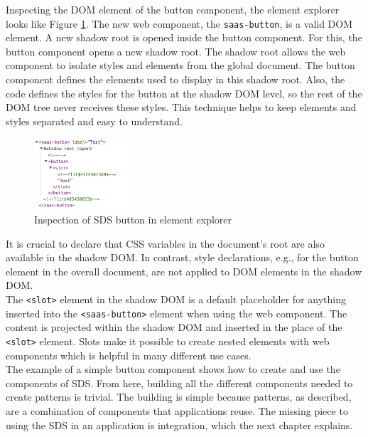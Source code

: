Inspecting the \ac{DOM} element of the button component, the element explorer looks like Figure \ref{button_element_explorer}. The new web component, the \texttt{saas-button}, is a valid \ac{DOM} element. A new shadow root is opened inside the button component. For this, the button component opens a new shadow root. The shadow root allows the web component to isolate styles and elements from the global document. The button component defines the elements used to display in this shadow root. Also, the code defines the styles for the button at the shadow \ac{DOM} level, so the rest of the \ac{DOM} tree never receives these styles. This technique helps to keep elements and styles separated and easy to understand. \\
\begin{figure}[htbp]
    \centerline{\includegraphics[height=100px]{images/button_element_explorer.png}}
    \caption{Inspection of \ac{SDS} button in element explorer}
    \label{button_element_explorer}
\end{figure}
It is crucial to declare that \ac{CSS} variables in the document's root are also available in the shadow \ac{DOM}. In contrast, style declarations, e.g., for the button element in the overall document, are not applied to \ac{DOM} elements in the shadow \ac{DOM}. \\
The \texttt{<slot>} element in the shadow \ac{DOM} is a default placeholder for anything inserted into the \texttt{<saas-button>} element when using the web component. The content is projected within the shadow \ac{DOM} and inserted in the place of the \texttt{<slot>} element. Slots make it possible to create nested elements with web components which is helpful in many different use cases.  \\

The example of a simple button component shows how to create and use the components of \ac{SDS}. From here, building all the different components needed to create patterns is trivial. The building is simple because patterns, as described, are a combination of components that applications reuse. The missing piece to using the \ac{SDS} in an application is integration, which the next chapter explains.